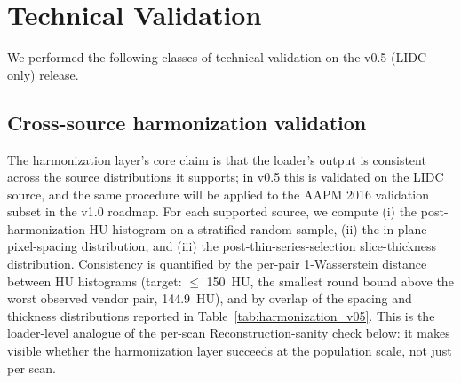 \documentclass[twoside,11pt]{article}
\begin{document}
\section*{Technical Validation}

We performed the following classes of technical validation on the v0.5 (LIDC-only) release.

\subsection*{Cross-source harmonization validation}
The harmonization layer's core claim is that the loader's output is consistent across the source distributions it supports; in v0.5 this is validated on the LIDC source, and the same procedure will be applied to the AAPM 2016 validation subset in the v1.0 roadmap. For each supported source, we compute (i) the post-harmonization HU histogram on a stratified random sample, (ii) the in-plane pixel-spacing distribution, and (iii) the post-thin-series-selection slice-thickness distribution. Consistency is quantified by the per-pair 1-Wasserstein distance between HU histograms (target: $\leq$ 150~HU, the smallest round bound above the worst observed vendor pair, 144.9~HU), and by overlap of the spacing and thickness distributions reported in Table~\ref{tab:harmonization_v05}. This is the loader-level analogue of the per-scan Reconstruction-sanity check below: it makes visible whether the harmonization layer succeeds at the population scale, not just per scan.
\end{document}
